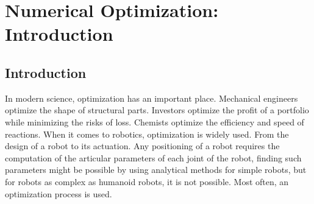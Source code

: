 

\chapter{Numerical Optimization: Introduction}
\label{chapter:optimization}

\graphicspath{{Appendix1-Optim/Figs/}}

\section{Introduction}
In modern science, optimization has an important place.
Mechanical engineers optimize the shape of structural parts.
Investors optimize the profit of a portfolio while minimizing the risks of loss.
Chemists optimize the efficiency and speed of reactions.
When it comes to robotics, optimization is widely used.
From the design of a robot to its actuation.
Any positioning of a robot requires the computation of the articular parameters of each joint of the robot, finding such parameters might be possible by using analytical methods for simple robots, but for robots as complex as humanoid robots, it is not possible.
Most often, an optimization process is used.


